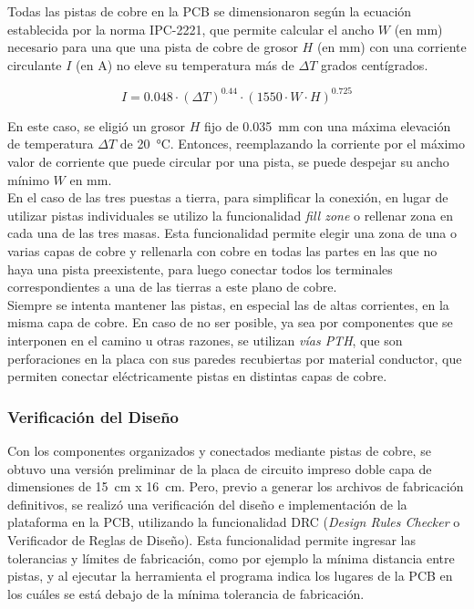 Todas las pistas de cobre en la PCB se dimensionaron según la ecuación establecida por la norma IPC-2221, que permite calcular el ancho $W$ (en \unit{\milli\metre}) necesario para una que una pista de cobre de grosor $H$ (en \unit{\milli\metre}) con una corriente circulante $I$ (en \unit{\ampere}) no eleve su temperatura más de $\Delta T$ grados centígrados.

\begin{equation}\label{eq:IPC2221}
    I = \num{0.048}\cdot (\Delta T)^{\num{0.44}}\cdot (\num{1550}\cdot W\cdot H)^{\num{0.725}}
\end{equation}

En este caso, se eligió un grosor $H$ fijo de \SI[]{0.035}[]{\milli\metre} con una máxima elevación de temperatura $\Delta T$ de \SI[]{20}[]{\celsius}. Entonces, reemplazando la corriente por el máximo valor de corriente que puede circular por una pista, se puede despejar su ancho mínimo $W$ en \unit{\milli\metre}.\\

En el caso de las tres puestas a tierra, para simplificar la conexión, en lugar de utilizar pistas individuales se utilizo la funcionalidad \textit{fill zone} o rellenar zona en cada una de las tres masas. Esta funcionalidad permite elegir una zona de una o varias capas de cobre y rellenarla con cobre en todas las partes en las que no haya una pista preexistente, para luego conectar todos los terminales correspondientes a una de las tierras a este plano de cobre.\\

Siempre se intenta mantener las pistas, en especial las de altas corrientes, en la misma capa de cobre. En caso de no ser posible, ya sea por componentes que se interponen en el camino u otras razones, se utilizan \textit{vías PTH}, que son perforaciones en la placa con sus paredes recubiertas por material conductor, que permiten conectar eléctricamente pistas en distintas capas de cobre.\\

\subsubsection{Verificación del Diseño}
 
Con los componentes organizados y conectados mediante pistas de cobre, se obtuvo una versión preliminar de la placa de circuito impreso doble capa de dimensiones de \SI[]{15}[]{\centi\metre} x \SI[]{16}[]{\centi\metre}. Pero, previo a generar los archivos de fabricación definitivos, se realizó una verificación del diseño e implementación de la plataforma en la PCB, utilizando la funcionalidad DRC (\textit{Design Rules Checker} o Verificador de Reglas de Diseño). Esta funcionalidad permite ingresar las tolerancias y límites de fabricación, como por ejemplo la mínima distancia entre pistas, y al ejecutar la herramienta el programa indica los lugares de la PCB en los cuáles se está debajo de la mínima tolerancia de fabricación.\\

